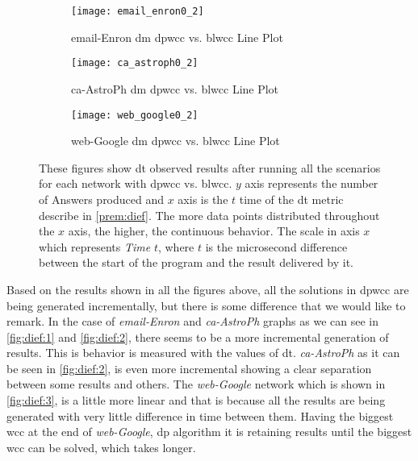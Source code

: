 \begin{figure}[!htp]
  \centering
  \begin{subfigure}[t]{0.3\textwidth}
   \texttt{[image: email\_enron0\_2]}
   \caption{email-Enron \acrlong{dm} \acrshort{dpwcc} vs. \acrshort{blwcc} Line Plot}
    \label{fig:dief:1}
  \end{subfigure}\hfill
  \begin{subfigure}[t]{0.3\textwidth}
   \texttt{[image: ca\_astroph0\_2]}
   \caption{ca-AstroPh \acrlong{dm} \acrshort{dpwcc} vs. \acrshort{blwcc} Line Plot}
    \label{fig:dief:2}
  \end{subfigure}\hfill
  \begin{subfigure}[t]{0.3\textwidth}
   \texttt{[image: web\_google0\_2]}
   \caption{web-Google \acrlong{dm} \acrshort{dpwcc} vs. \acrshort{blwcc} Line Plot}
    \label{fig:dief:3}
  \end{subfigure}\hfill
   \caption{These figures show \acrshort{dt} observed results after running all the scenarios for each network with \acrshort{dpwcc} vs. \acrshort{blwcc}. $y$ axis represents the number of Answers produced and $x$ axis is the $t$ time of the \acrshort{dt} metric describe in \autoref{prem:dief}. The more data points distributed throughout the $x$ axis, the higher, the continuous behavior. The scale in axis $x$ which represents \textit{Time} $t$, where $t$ is the microsecond difference between the start of the program and the result delivered by it.}
   \label{fig:dief:old:all}
 \end{figure}


Based on the results shown in all the figures above, all the solutions in \acrshort{dpwcc} are being generated incrementally, but there is some difference that we would like to remark. 
In the case of \emph{email-Enron} and \emph{ca-AstroPh} graphs as we can see in \autoref{fig:dief:1} and \autoref{fig:dief:2}, there seems to be a more incremental generation of results. 
This is behavior is measured with the values of \acrfull{dt}. \emph{ca-AstroPh} as it can be seen in \autoref{fig:dief:2}, is even more incremental showing a clear separation between some results and others. 
The \emph{web-Google} network which is shown in \autoref{fig:dief:3}, is a little more linear and that is because all the results are being generated with very little difference in time between them. 
Having the biggest \acrshort{wcc} at the end of \emph{web-Google}, \acrshort{dp} algorithm it is retaining results until the biggest \acrshort{wcc} can be solved, which takes longer. 


